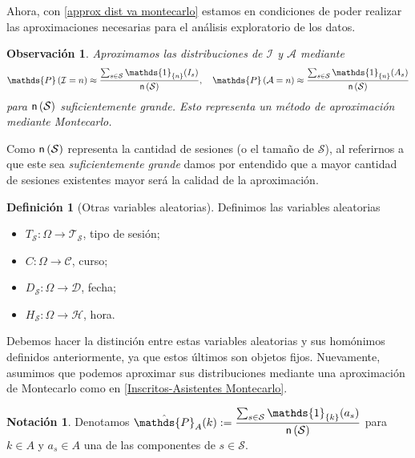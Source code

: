 \documentclass[11pt,a4paper]{book}
\newtheorem{observacion}[teorema]{Observaci\'on}
\theoremstyle{definition}%
\newtheorem{definicion}[teorema]{Definici\'on}
\newtheorem{notacion}[teorema]{Notaci\'on}
\newcommand{\Probsymb}{\mathds{P}}
\newcommand{\Prob}[1]{\mathds{P}\left( #1 \right)}
\newcommand{\card}[1]{\text{\textsf{n}}\left( #1 \right)}
\begin{document}
            Ahora, con \ref{approx dist va montecarlo} estamos en condiciones de poder realizar las aproximaciones necesarias para el análisis exploratorio de los datos.
            \begin{observacion}\label{aprox fundamental}
                Aproximamos las distribuciones de $\mathcal{I}$ y $\mathcal{A}$ mediante
                \begin{equation}\label{Inscritos-Asistentes Montecarlo}
                    \Prob{\mathcal{I}=n}\approx \dfrac{\sum_{s\in \mathcal{S}} \mathds{1}_{\{n\}}(I_s)}{\card{\mathcal{S}}},\quad \Prob{\mathcal{A}=n}\approx \dfrac{\sum_{s\in \mathcal{S}} \mathds{1}_{\{n\}}(A_s)}{\card{\mathcal{S}}}
                \end{equation}
                para $\card{\mathcal{S}}$ suficientemente grande. Esto representa un método de aproximación mediante Montecarlo.
            \end{observacion}

            Como $\card{\mathcal{S}}$ representa la cantidad de sesiones (o el tamaño de $\mathcal{S}$), al referirnos a que este sea \textit{suficientemente grande} damos por entendido que a mayor cantidad de sesiones existentes mayor será la calidad de la aproximación.

            \begin{definicion}[Otras variables aleatorias]
                Definimos las variables aleatorias
                \begin{itemize}
                    \item $T_\mathcal{S}:\Omega\longrightarrow \mathcal{T}_\mathcal{S}$, tipo de sesión;
                    \item $C:\Omega\longrightarrow \mathcal{C}$, curso;
                    \item $D_\mathcal{S}:\Omega\longrightarrow \mathcal{D}$, fecha;
                    \item $H_\mathcal{S}:\Omega\longrightarrow \mathcal{H}$, hora.
                \end{itemize}
            \end{definicion}
            Debemos hacer la distinción entre estas variables aleatorias y sus homónimos definidos anteriormente, ya que estos últimos son objetos fijos. Nuevamente, asumimos que podemos aproximar sus distribuciones mediante una aproximación de Montecarlo como en \ref{Inscritos-Asistentes Montecarlo}.

            \begin{notacion}
                Denotamos $\hat{\Probsymb}_A(k):=\dfrac{\sum_{s\in \mathcal{S}} \mathds{1}_{\{k\}}(a_s)}{\card{\mathcal{S}}}$ para $k\in A$ y $a_s\in A$ una de las componentes de $s\in\mathcal{S}$.
            \end{notacion}
\end{document}
